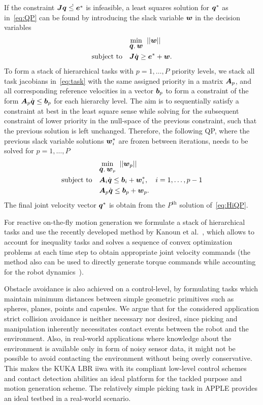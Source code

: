 If the constraint $\mbox{\boldmath $J$}\dot{\mbox{\boldmath $q$} \leq \mbox{\boldmath $e$}^*}$ is infeasible, a least squares solution for
$\mbox{\boldmath $q$}^*$ as in~\eqref{eq:QP} can be found by introducing the slack variable $\mbox{\boldmath $w$}$ in the
decision variables
%
\begin{align}\label{eq:iQP}
  &\underset{\dot{\mbox{\boldmath $q$}},\;\mbox{\boldmath $w$}}{\mbox{min}}\;\;||\mbox{\boldmath $w$}||\\
   \mbox{subject to} \quad &\mbox{\boldmath $J$}\dot{\mbox{\boldmath $q$}} \geq \mbox{\boldmath $e$}^* + \mbox{\boldmath $w$}. \nonumber
\end{align}
%
To form a stack of hierarchical tasks with $p=1,\dots,P$ priority levels, we stack all task
jacobians in~\eqref{eq:task} with the same assigned priority in a matrix $\mbox{\boldmath $A$}_p$, and all
corresponding reference velocities in a vector $\mbox{\boldmath $b$}_p$ to form a constraint of the form
$\mbox{\boldmath $A$}_p\dot{\mbox{\boldmath $q$}}\leq \mbox{\boldmath $b$}_p$ for each hierarchy level. The aim is to sequentially satisfy
a constraint at best in the least square sense while solving for the subsequent constraint of lower
priority in the null-space of the previous constraint, such that the previous solution is left
unchanged. Therefore, the following QP, where the previous slack variable solutions $\mbox{\boldmath $w$}_i^*$
are frozen between iterations, needs to be solved for $p=1,\ldots,P$
%
\begin{align}\label{eq:HiQP}
  &\underset{\dot{\mbox{\boldmath $q$}},\;\mbox{\boldmath $w$}_p}{\mbox{min}}\;\;||\mbox{\boldmath $w$}_p||\\
   \mbox{subject to} \quad &\mbox{\boldmath $A$}_i\dot{\mbox{\boldmath $q$}} \leq \mbox{\boldmath $b$}_i + \mbox{\boldmath $w$}_i^*, \quad i=1,\dots,p-1 \nonumber \\
                           &\mbox{\boldmath $A$}_p\dot{\mbox{\boldmath $q$}} \leq \mbox{\boldmath $b$}_p + \mbox{\boldmath $w$}_p.  \nonumber 
\end{align}
%
The final joint velocity vector $\mbox{\boldmath $q$}^*$ is obtain from the $P^{\mbox{th}}$ solution
of~\eqref{eq:HiQP}.

For reactive on-the-fly motion generation we formulate a stack of hierarchical tasks and use the
recently developed method by Kanoun et al.~\cite{Kano11}, which allows to account for inequality
tasks and solves a sequence of convex optimization problems at each time step to obtain
appropriate joint velocity commands (the method also can be used to directly generate torque
commands while accounting for the robot dynamics~\cite{Saab13}).
 
Obstacle avoidance is also achieved on a control-level, by formulating tasks which maintain minimum
distances between simple geometric primitives such as spheres, planes, points and capsules. We argue
that for the considered application strict collision avoidance is neither necessary nor desired,
since picking and manipulation inherently necessitates contact events between the robot and the
environment. Also, in real-world applications where knowledge about the environment is available
only in form of noisy sensor data, it might not be possible to avoid contacting the environment
without being overly conservative. This makes the KUKA LBR iiwa with its compliant low-level control
schemes and contact detection abilities an ideal platform for the tackled purpose and motion
generation scheme. The relatively simple picking task in APPLE provides an ideal testbed in a
real-world scenario.

